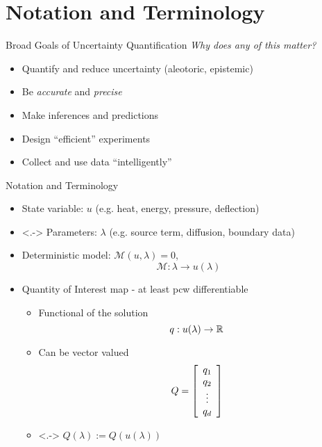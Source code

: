 % 


\section{Notation and Terminology}
\begin{frame}[t]{Broad Goals of Uncertainty Quantification}
\centering
    \emph{Why does any of this matter?}
	\vskip 20pt

    \begin{itemize}
        \item Quantify and reduce uncertainty (aleotoric, epistemic)
	    \vskip 20pt
	    \item Be \emph{accurate} and \emph{precise}
	    \vskip 20pt
	    \item Make inferences and predictions
	    \vskip 20pt
	    \item Design ``efficient'' experiments
	    \vskip 20pt
	    \item Collect and use data ``intelligently''
    \end{itemize}
    
\end{frame}

\begin{frame}[t]{Notation and Terminology}
\begin{itemize}
	\item State variable: $u$ {\color{gray}(e.g. heat, energy, pressure, deflection)}
	\vskip 10pt
	\item<.-> Parameters: $\lambda$ {\color{gray}(e.g. source term, diffusion, boundary data)}
	\vskip 10pt
		\item Deterministic model: $\mathcal{M} (u, \lambda) = 0$, $$\mathcal{M}:\lambda \to u(\lambda)$$

	\item Quantity of Interest map  - at least pcw differentiable \vskip 5pt
		\begin{itemize}
		\item Functional of the solution $$q: u(\lambda) \to \RR$$
		\item Can be vector valued $$Q = \mat{c}{q_1\\ q_2\\ \vdots \\ q_d}$$
		\item<.-> $Q(\lambda) := Q(u(\lambda))$
	\end{itemize}

\end{itemize}

\end{frame}


